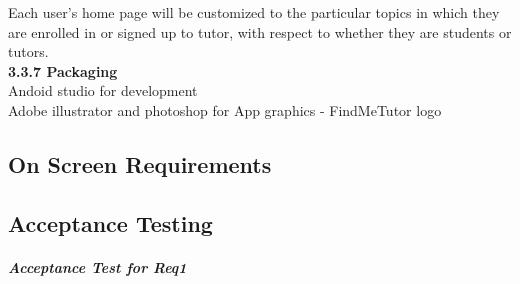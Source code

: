 \documentclass[12pt]{article}
\begin{document}
{Each user's home page will be customized to the particular topics in which they are enrolled in or signed up to tutor, with respect to whether they are students or tutors. \\
\textbf{3.3.7 Packaging}\\
Andoid studio for development\\
Adobe illustrator and photoshop for App graphics - FindMeTutor logo\\

}
\subsection{On Screen Requirements}

\subsection{Acceptance Testing}
\subparagraph{Acceptance Test for Req1}
\end{document}
